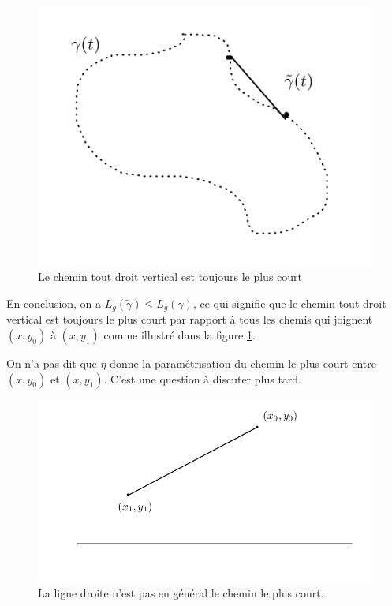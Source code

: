 \documentclass[french]{article}
\theoremstyle{definition}
\theoremstyle{remark}
\begin{document}
\begin{figure}[h!]
  \centering
  \includegraphics[scale=0.2]{figures/chemin-vert-court.png}
  \caption{Le chemin tout droit vertical est toujours le plus court}
  \label{chemin-vert-court}
\end{figure}

En conclusion, on a \(L_g(\tilde{\gamma}) \leq L_g(\gamma)\), ce qui signifie que le chemin tout droit vertical est toujours le plus court par rapport à tous les chemis qui joignent \((x,y_0)\) à \((x,y_1)\) comme illustré dans la figure \ref{chemin-vert-court}.

{\selectfont{}\relax} On n'a pas dit que \(\eta\) donne la paramétrisation du chemin le plus court entre \((x,y_0)\) et \((x,y_1)\). C'est une question à discuter plus tard.

\begin{figure}[h!]
  \centering
  \includegraphics[scale=0.3]{figures/ligne-pas-tres-courte.png}
  \caption{La ligne droite n'est pas en général le chemin le plus court.}
  \label{}
\end{figure}
\end{document}
